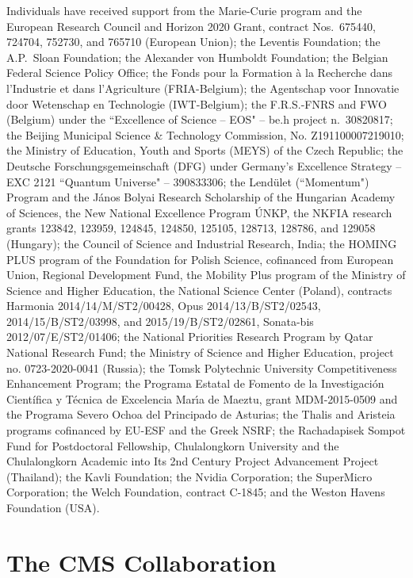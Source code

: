 \documentclass[11pt,a4paper,cmspaper,final,collab]{cms-tdr}
\begin{document}
\begin{acknowledgments}
   Individuals have received support from the Marie-Curie program and the European Research Council and Horizon 2020 Grant, contract Nos.\ 675440, 724704, 752730, and 765710 (European Union); the Leventis Foundation; the A.P.\ Sloan Foundation; the Alexander von Humboldt Foundation; the Belgian Federal Science Policy Office; the Fonds pour la Formation \`a la Recherche dans l'Industrie et dans l'Agriculture (FRIA-Belgium); the Agentschap voor Innovatie door Wetenschap en Technologie (IWT-Belgium); the F.R.S.-FNRS and FWO (Belgium) under the ``Excellence of Science -- EOS" -- be.h project n.\ 30820817; the Beijing Municipal Science \& Technology Commission, No. Z191100007219010; the Ministry of Education, Youth and Sports (MEYS) of the Czech Republic; the Deutsche Forschungsgemeinschaft (DFG) under Germany's Excellence Strategy -- EXC 2121 ``Quantum Universe" -- 390833306; the Lend\"ulet (``Momentum") Program and the J\'anos Bolyai Research Scholarship of the Hungarian Academy of Sciences, the New National Excellence Program \'UNKP, the NKFIA research grants 123842, 123959, 124845, 124850, 125105, 128713, 128786, and 129058 (Hungary); the Council of Science and Industrial Research, India; the HOMING PLUS program of the Foundation for Polish Science, cofinanced from European Union, Regional Development Fund, the Mobility Plus program of the Ministry of Science and Higher Education, the National Science Center (Poland), contracts Harmonia 2014/14/M/ST2/00428, Opus 2014/13/B/ST2/02543, 2014/15/B/ST2/03998, and 2015/19/B/ST2/02861, Sonata-bis 2012/07/E/ST2/01406; the National Priorities Research Program by Qatar National Research Fund; the Ministry of Science and Higher Education, project no. 0723-2020-0041 (Russia); the Tomsk Polytechnic University Competitiveness Enhancement Program; the Programa Estatal de Fomento de la Investigaci{\'o}n Cient{\'i}fica y T{\'e}cnica de Excelencia Mar\'{\i}a de Maeztu, grant MDM-2015-0509 and the Programa Severo Ochoa del Principado de Asturias; the Thalis and Aristeia programs cofinanced by EU-ESF and the Greek NSRF; the Rachadapisek Sompot Fund for Postdoctoral Fellowship, Chulalongkorn University and the Chulalongkorn Academic into Its 2nd Century Project Advancement Project (Thailand); the Kavli Foundation; the Nvidia Corporation; the SuperMicro Corporation; the Welch Foundation, contract C-1845; and the Weston Havens Foundation (USA).
  
\end{acknowledgments}


   
\cleardoublepage \appendix\section{The CMS Collaboration \label{app:collab}}\begin{sloppypar}\end{sloppypar}
\end{document}
